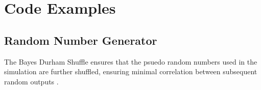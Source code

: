\chapter{Code Examples}

\section{Random Number Generator}

The Bayes Durham Shuffle ensures that the psuedo random numbers used in the simulation are further shuffled, ensuring minimal correlation between subsequent random outputs \cite{NumericalRecipes}.

% 
% 
% 
% 

